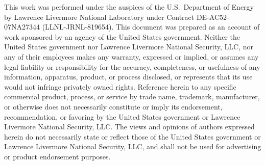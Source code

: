 \documentclass[12pt]{amsart}
\begin{document}
This work was performed under the auspices of the U.S.\ Department of Energy by Lawrence Livermore National Laboratory under Contract DE-AC52-07NA27344 (LLNL-JRNL-819654).
This document was prepared as an account of work sponsored by an agency of the United States government.
Neither the United States government nor Lawrence Livermore National Security, LLC, nor any of their employees makes any warranty, expressed or implied, or assumes any legal liability or responsibility for the accuracy, completeness, or usefulness of any information, apparatus, product, or process disclosed, or represents that its use would not infringe privately owned rights.
Reference herein to any specific commercial product, process, or service by trade name, trademark, manufacturer, or otherwise does not necessarily constitute or imply its endorsement, recommendation, or favoring by the United States government or Lawrence Livermore National Security, LLC.
The views and opinions of authors expressed herein do not necessarily state or reflect those of the United States government or Lawrence Livermore National Security, LLC, and shall not be used for advertising or product endorsement purposes.



\end{document}
